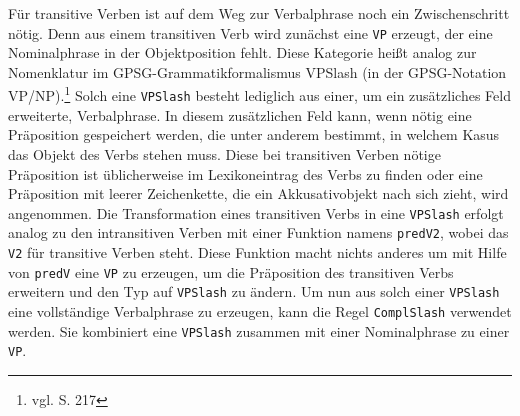 Für transitive Verben ist auf dem Weg zur Verbalphrase noch ein Zwischenschritt nötig. Denn aus einem transitiven Verb wird zunächst eine \texttt{VP} erzeugt, der eine Nominalphrase in der Objektposition fehlt. Diese Kategorie heißt analog zur Nomenklatur im GPSG-Grammatikformalismus VPSlash (in der GPSG-Notation VP/NP).\footnote{vgl. \cite{RANTA2011} S. 217} Solch eine \texttt{VPSlash} besteht lediglich aus einer, um ein zusätzliches Feld erweiterte, Verbalphrase. In diesem zusätzlichen Feld kann, wenn nötig eine Präposition gespeichert werden, die unter anderem bestimmt, in welchem Kasus das Objekt des Verbs stehen muss. Diese bei transitiven Verben nötige Präposition ist üblicherweise im Lexikoneintrag des Verbs zu finden oder eine Präposition mit leerer Zeichenkette, die ein Akkusativobjekt nach sich zieht, wird angenommen. Die Transformation eines transitiven Verbs in eine \texttt{VPSlash} erfolgt analog zu den intransitiven Verben mit einer Funktion namens \texttt{predV2}, wobei das \texttt{V2} für transitive Verben steht. Diese Funktion macht nichts anderes um mit Hilfe von \texttt{predV} eine \texttt{VP} zu erzeugen, um die Präposition des transitiven Verbs erweitern und den Typ auf \texttt{VPSlash} zu ändern. Um nun aus solch einer \texttt{VPSlash} eine vollständige Verbalphrase zu erzeugen, kann die Regel \texttt{ComplSlash} verwendet werden. Sie kombiniert eine \texttt{VPSlash} zusammen mit einer Nominalphrase zu einer \texttt{VP}.
\FloatBarrier
